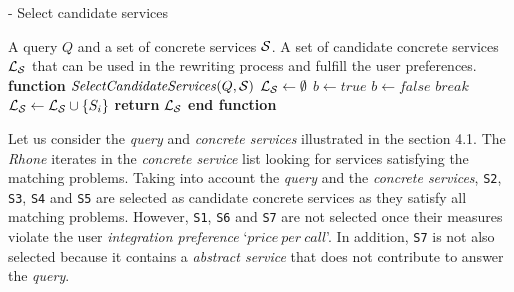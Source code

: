 
\begin{algorithm}
\small
\caption{ - Select candidate services}
\label{selectingservices}
\begin{algorithmic}[1]
\REQUIRE A query $Q$ and a set of concrete services $\hbox{${\cal S}$}$.
\ENSURE A set of candidate concrete services $\hbox{${\cal L_{S}}$}$ that can be used in the rewriting process and fulfill the user preferences.
\STATE \textbf{function} $\mathit{SelectCandidateServices} (Q, \hbox{${\cal S}$})$
\STATE $\hbox{${\cal L_{S}}$} \leftarrow \emptyset$
		\STATE $b \leftarrow \mathit{true}$		
				\STATE $b \leftarrow \mathit{false}$	
				\STATE $\mathit{break}$
			\ENDIF
		\ENDFOR
			\STATE $\hbox{${\cal L_{S}}$} \leftarrow \hbox{${\cal L_{S}}$} \cup \lbrace S_{i} \rbrace$	
		\ENDIF
	\ENDIF
\ENDFOR
\STATE \textbf{return} $\hbox{${\cal L_{S}}$}$
\STATE \textbf{end function}
\end{algorithmic}
\end{algorithm}

Let us consider the \textit{query} and \textit{concrete services} illustrated in the section 4.1.
The \textit{Rhone} iterates in the \textit{concrete service} list looking for services satisfying the matching problems.
Taking into account the \textit{query} and the \textit{concrete services}, \texttt{S2}, \texttt{S3}, \texttt{S4} and \texttt{S5} are selected as candidate concrete services as they satisfy all matching problems. However, \texttt{S1}, \texttt{S6} and \texttt{S7} are not selected once their measures violate the user \textit{integration preference} `$price \ per \ call$'. In addition, \texttt{S7} is not also selected because it contains a \textit{abstract service} that does not contribute to answer the \textit{query}.

